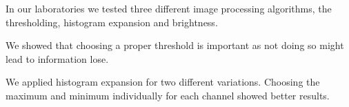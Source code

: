 \documentclass{article}
\begin{document}
In our laboratories we tested three different image processing algorithms, the thresholding, histogram expansion and brightness.

We showed that choosing a proper threshold is important as not doing so might lead to information lose.

We applied histogram expansion for two different variations. Choosing the maximum and minimum individually for each channel showed better results.





\end{document}
